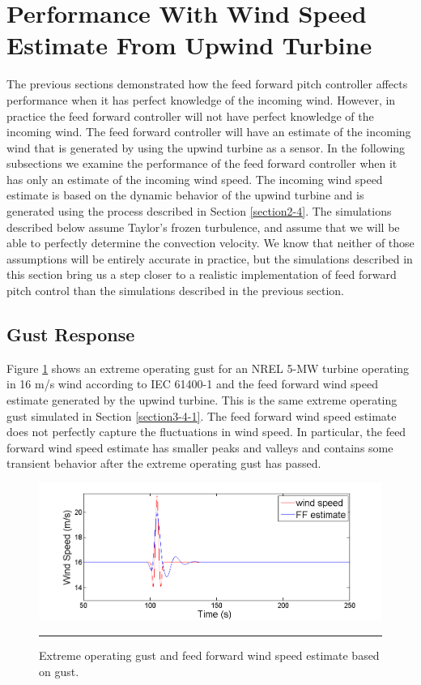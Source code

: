 \section{Performance With Wind Speed Estimate From Upwind Turbine} \label{section3-5}
The previous sections demonstrated how the feed forward pitch controller affects performance when it has perfect knowledge of the incoming wind. However, in practice the feed forward controller will not have perfect knowledge of the incoming wind. The feed forward controller will have an estimate of the incoming wind that is generated by using the upwind turbine as a sensor. In the following subsections we examine the performance of the feed forward controller when it has only an estimate of the incoming wind speed. The incoming wind speed estimate is based on the dynamic behavior of the upwind turbine and is generated using the process described in Section \ref{section2-4}. The simulations described below assume Taylor's frozen turbulence, and assume that we will be able to perfectly determine the convection velocity. We know that neither of those assumptions will be entirely accurate in practice, but the simulations described in this section bring us a step closer to a realistic implementation of feed forward pitch control than the simulations described in the previous section.

\subsection{Gust Response} \label{section3-5-1}
Figure \ref{fig3-24} shows an extreme operating gust for an NREL 5-MW turbine operating in 16 m/s wind according to IEC 61400-1 \cite{IEC2005} and the feed forward wind speed estimate generated by the upwind turbine. This is the same extreme operating gust simulated in Section \ref{section3-4-1}. The feed forward wind speed estimate does not perfectly capture the fluctuations in wind speed. In particular, the feed forward wind speed estimate has smaller peaks and valleys and contains some transient behavior after the extreme operating gust has passed.



\begin{figure}[htbp]
	\centering
		\includegraphics[trim = {1cm 0 2cm 0}, clip, width = \linewidth]{Figures/ch3Figures/fig3-24.png}
		\rule{35em}{0.5pt}
	\caption{Extreme operating gust and feed forward wind speed estimate based on gust.}
	\label{fig3-24}
\end{figure}

